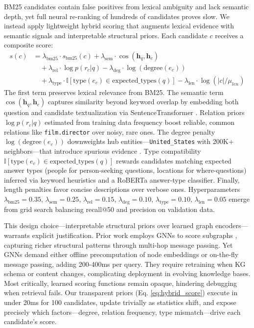 \documentclass[conference]{IEEEtran}
\begin{document}
BM25 candidates contain false positives from lexical ambiguity and lack semantic depth, yet full neural re-ranking of hundreds of candidates proves slow. We instead apply lightweight hybrid scoring that augments lexical evidence with semantic signals and interpretable structural priors. Each candidate $c$ receives a composite score:
\begin{align}
s(c) &= \lambda_{\text{bm25}} \cdot s_{\text{bm25}}(c) + \lambda_{\text{sem}} \cdot \cos(\mathbf{h}_q, \mathbf{h}_c) \nonumber \\
&\quad + \lambda_{\text{rel}} \cdot \log p(r_c | q) - \lambda_{\text{deg}} \cdot \log(\text{degree}(e_c)) \nonumber \\
&\quad + \lambda_{\text{type}} \cdot \mathbb{I}[\text{type}(e_c) \in \text{expected\_types}(q)] - \lambda_{\text{len}} \cdot \log(|c|/\mu_{len})
\label{eq:hybrid_score}
\end{align}
The first term preserves lexical relevance from BM25. The semantic term $\cos(\mathbf{h}_q, \mathbf{h}_c)$ captures similarity beyond keyword overlap by embedding both question and candidate textualization via SentenceTransformer \cite{reimers2019sentencebert}. Relation priors $\log p(r_c | q)$ estimated from training data frequency boost reliable, common relations like \texttt{film.director} over noisy, rare ones. The degree penalty $\log(\text{degree}(e_c))$ downweights hub entities—\texttt{United\_States} with 200K+ neighbors—that introduce spurious evidence \cite{saxena2020improving,miller2016keyvalue}. Type compatibility $\mathbb{I}[\text{type}(e_c) \in \text{expected\_types}(q)]$ rewards candidates matching expected answer types (people for person-seeking questions, locations for where-questions) inferred via keyword heuristics and a RoBERTa answer-type classifier. Finally, length penalties favor concise descriptions over verbose ones. Hyperparameters $\lambda_{\text{bm25}}=0.35$, $\lambda_{\text{sem}}=0.25$, $\lambda_{\text{rel}}=0.15$, $\lambda_{\text{deg}}=0.10$, $\lambda_{\text{type}}=0.10$, $\lambda_{\text{len}}=0.05$ emerge from grid search balancing recall@50 and precision on validation data.

This design choice—interpretable structural priors over learned graph encoders—warrants explicit justification. Prior work employs GNNs to score subgraphs \cite{yasunaga2021qagnn,mavromatis2024gnn,zhang2022greaselm}, capturing richer structural patterns through multi-hop message passing. Yet GNNs demand either offline precomputation of node embeddings or on-the-fly message passing, adding 200-400ms per query. They require retraining when KG schema or content changes, complicating deployment in evolving knowledge bases. Most critically, learned scoring functions remain opaque, hindering debugging when retrieval fails. Our transparent priors (Eq. \ref{eq:hybrid_score}) execute in under 20ms for 100 candidates, update trivially as statistics shift, and expose precisely which factors—degree, relation frequency, type mismatch—drive each candidate's score.
\end{document}
